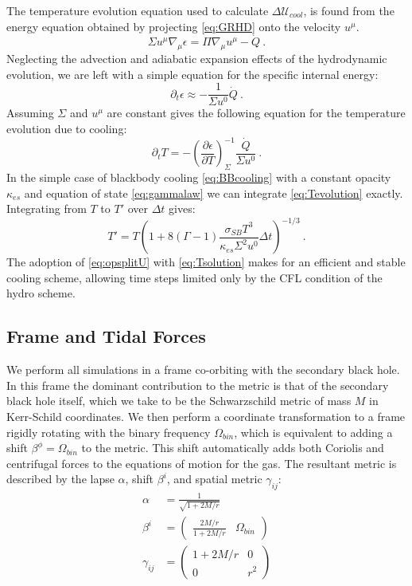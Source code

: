 \documentclass{emulateapj}
\newcommand{\al}{\alpha}
\newcommand{\be}{\beta}
\newcommand{\gam}{\gamma}
\newcommand{\Gam}{\Gamma}
\newcommand{\De}{\Delta}
\newcommand{\eps}{\epsilon}
\newcommand{\sig}{\sigma}
\newcommand{\Sig}{\Sigma}
\newcommand{\ka}{\kappa}
\newcommand{\Om}{\Omega}
\newcommand{\pd}{\partial}
\begin{document}
The temperature evolution equation used to calculate $\De \mathcal{U}_{cool}$, is found from the energy equation obtained by projecting \eqref{eq:GRHD} onto the velocity $u^\mu$.
\begin{equation}
	\Sig u^\mu \nabla_\mu \eps = \Pi \nabla_\mu u^\mu - \dot{Q} \ .
\end{equation}
Neglecting the advection and adiabatic expansion effects of the hydrodynamic evolution, we are left with a simple equation for the specific internal energy:
\begin{equation}
	\pd_t \eps \approx - \frac{1}{\Sig u^0} \dot{Q} \ .
\end{equation}
Assuming $\Sig$ and $u^\mu$ are constant gives the following equation for the temperature evolution due to cooling:
\begin{equation}
	\pd_t T = - \left(\frac{\pd \eps}{\pd T}\right)_{\Sig}^{-1} \frac{\dot{Q}}{\Sig u^0} \ . \label{eq:Tevolution}
\end{equation}
In the simple case of blackbody cooling \eqref{eq:BBcooling} with a constant opacity $\ka_{es}$ and equation of state \eqref{eq:gammalaw} we can integrate \eqref{eq:Tevolution} exactly.  Integrating from $T$ to $T'$ over $\De t$ gives:
\begin{equation}
	T' = T \left( 1 + 8 (\Gam-1) \frac{\sig_{SB} T^3}{\ka_{es}\Sig^2 u^0} \De t \right)^{-1/3} \ . \label{eq:Tsolution}
\end{equation}
The adoption of \eqref{eq:opsplitU} with \eqref{eq:Tsolution} makes for an efficient and stable cooling scheme, allowing time steps limited only by the CFL condition of the hydro scheme.


\subsection{Frame and Tidal Forces}
\label{subsec:frameforces}

We perform all simulations in a frame co-orbiting with the secondary black hole.  In this frame the dominant contribution to the metric is that of the secondary black hole itself, which we take to be the Schwarzschild metric of mass $M$ in Kerr-Schild coordinates.  We then perform a coordinate transformation to a frame rigidly rotating with the binary frequency $\Om_{bin}$, which is equivalent to adding a shift $\be^\phi = \Om_{bin}$ to the metric.  This shift automatically adds both Coriolis and centrifugal forces to the equations of motion for the gas.  The resultant metric is described by the lapse $\al$, shift $\be^i$, and spatial metric $\gam_{ij}$:
\begin{align}
	\al &= \frac{1}{\sqrt{1+2M/r}} \\
	\be^i &= \begin{pmatrix} \frac{2M/r}{1+2M/r} & \Om_{bin} \end{pmatrix} \\
	\gam_{ij} &= \begin{pmatrix} 1+2M/r & 0 \\ 0 & r^2 \end{pmatrix}
\end{align}
\end{document}
